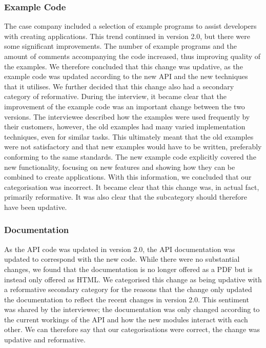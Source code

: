 \documentclass{sig-alternate}
\begin{document}
\subsubsection{Example Code} %
The case company included a selection of example programs to assist developers with creating applications. This trend continued in version 2.0, but there were some significant improvements. The number of example programs and the amount of comments accompanying the code increased, thus improving quality of the examples. We therefore concluded that this change was updative, as the example code was updated according to the new API and the new techniques that it utilises. We further decided that this change also had a secondary category of reformative. During the interview, it became clear that the improvement of the example code was an important change between the two versions. The interviewee described how the examples were used frequently by their customers, however, the old examples had many varied implementation techniques, even for similar tasks. This ultimately meant that the old examples were not satisfactory and that new examples would have to be written, preferably conforming to the same standards. The new example code explicitly covered the new functionality, focusing on new features and showing how they can be combined to create applications. With this information, we concluded that our categorisation was incorrect. It became clear that this change was, in actual fact, primarily reformative. It was also clear that the subcategory should therefore have been updative. 

\subsubsection{Documentation} %
As the API code was updated in version 2.0, the API documentation was updated to correspond with the new code. While there were no substantial changes, we found that the documentation is no longer offered as a PDF but is instead only offered as HTML.  We categorised this change as being updative with a reformative secondary category for the reasons that the change only updated the documentation to reflect the recent changes in version 2.0. This sentiment was shared by the interviewee; the documentation was only changed according to the current workings of the API and how the new modules interact with each other. We can therefore say that our categorisations were correct, the change was updative and reformative.
\end{document}
